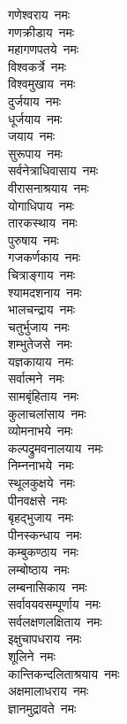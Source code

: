 \begin{multicols}{2}
\begin{flushleft}
गणेश्वराय~नमः\\
गणक्रीडाय~नमः\\
महागणपतये~नमः\\
विश्वकर्त्रे~नमः\\
विश्वमुखाय~नमः\\
दुर्जयाय~नमः\\
धूर्जयाय~नमः\\
जयाय~नमः\\
सुरूपाय~नमः\\
सर्वनेत्राधिवासाय~नमः\hfill{}\\
वीरासनाश्रयाय~नमः\\
योगाधिपाय~नमः\\
तारकस्थाय~नमः\\
पुरुषाय~नमः\\
गजकर्णकाय~नमः\\
चित्राङ्गाय~नमः\\
श्यामदशनाय~नमः\\
भालचन्द्राय~नमः\\
चतुर्भुजाय~नमः\\
शम्भुतेजसे~नमः\hfill{}\\
यज्ञकायाय~नमः\\
सर्वात्मने~नमः\\
सामबृंहिताय~नमः\\
कुलाचलांसाय~नमः\\
व्योमनाभये~नमः\\
कल्पद्रुमवनालयाय~नमः\\
निम्ननाभये~नमः\\
स्थूलकुक्षये~नमः\\
पीनवक्षसे~नमः\\
बृहद्भुजाय~नमः\hfill{}\\
पीनस्कन्धाय~नमः\\
कम्बुकण्ठाय~नमः\\
लम्बोष्ठाय~नमः\\
लम्बनासिकाय~नमः\\
सर्वावयवसम्पूर्णाय~नमः\\
सर्वलक्षणलक्षिताय~नमः\\
इक्षुचापधराय~नमः\\
शूलिने~नमः\\
कान्तिकन्दलिताश्रयाय~नमः\\
अक्षमालाधराय~नमः\hfill{}\\
ज्ञानमुद्रावते~नमः\\

\end{flushleft}
\end{multicols}
